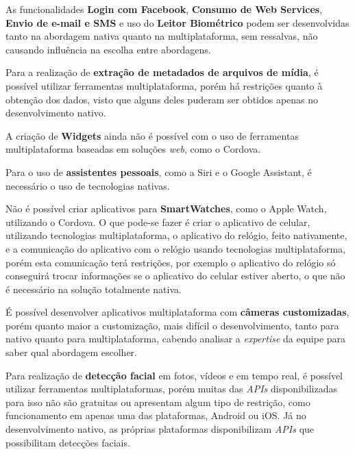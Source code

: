 As funcionalidades \textbf{Login com Facebook}, \textbf{Consumo de Web Services}, \textbf{Envio de e-mail e SMS} e uso do \textbf{Leitor Biométrico} podem ser desenvolvidas tanto na abordagem nativa quanto na 
multiplataforma, sem ressalvas, não causando influência na escolha entre abordagens.

Para a realização de \textbf{extração de metadados de arquivos de mídia}, é possível utilizar ferramentas multiplataforma, porém há restrições quanto à obtenção dos dados, visto que alguns deles 
puderam ser obtidos apenas no desenvolvimento nativo.

A criação de \textbf{Widgets} ainda não é possível com o uso de ferramentas multiplataforma baseadas em soluções \textit{web}, como o Cordova.

Para o uso de \textbf{assistentes pessoais}, como a Siri e o Google Assistant, é necessário o uso de tecnologias nativas.

Não é possível criar aplicativos para \textbf{SmartWatches}, como o Apple Watch, utilizando o Cordova. O que pode-se fazer é criar o aplicativo de celular, utilizando tecnologias multiplataforma, o aplicativo do relógio, 
feito nativamente, e a comunicação do aplicativo com o relógio usando tecnologias multiplataforma, porém esta comunicação terá restrições, por exemplo o aplicativo do relógio só conseguirá trocar informações se o 
aplicativo do celular estiver aberto, o que não é necessário na solução totalmente nativa.

É possível desenvolver aplicativos multiplataforma com \textbf{câmeras customizadas}, porém quanto maior a customização, mais difícil o desenvolvimento, tanto para nativo quanto para multiplataforma, cabendo analisar 
a \textit{expertise} da equipe para saber qual abordagem escolher.

Para realização de \textbf{detecção facial} em fotos, vídeos e em tempo real, é possível utilizar ferramentas multiplataformas, porém muitas das \textit{APIs} disponibilizadas para isso não são gratuitas ou apresentam 
algum tipo de restrição, como funcionamento em apenas uma das plataformas, Android ou iOS. Já no desenvolvimento nativo, as próprias plataformas disponibilizam \textit{APIs} que possibilitam detecções faciais.

\begin{comment}
Para a criação de aplicativos para \textbf{SmartTVs}, há no Cordova \textit{plugins} para iOS e para Android, mas não para os dois ao mesmo tempo, isso implica em desenvolver dois projetos separadamente de qualquer forma. Se 
a equipe tem \textit{expertise} em tecnologias \textit{web}, pode ser vantajoso desenvolver multiplataforma para se aproveitar disso, no entanto, ainda será preciso um computador com MacOS e Xcode. Portanto se o foco for 
desenvolver este tipo de aplicativo é mais vantajoso utilizar as tecnologias nativas disponiblizadas pelas plataformas, aproveitando, assim, o máximo de desempenho e capacidade dos dispositivos de TV.
\end{comment}

